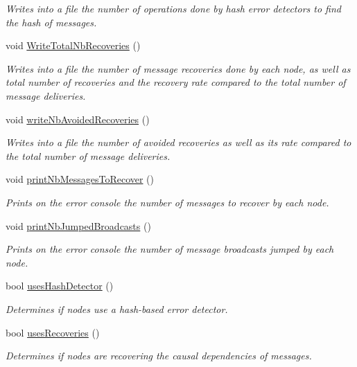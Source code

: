 \begin{DoxyCompactItemize}
\begin{DoxyCompactList}\small\item\em Writes into a file the number of operations done by hash error detectors to find the hash of messages. \end{DoxyCompactList}\item 
void \hyperlink{class_stats_a75689d1481b0605ce74d775e36c21740}{Write\+Total\+Nb\+Recoveries} ()
\begin{DoxyCompactList}\small\item\em Writes into a file the number of message recoveries done by each node, as well as total number of recoveries and the recovery rate compared to the total number of message deliveries. \end{DoxyCompactList}\item 
void \hyperlink{class_stats_ac6a0fdf44cc2a3dc11ff22eb75faacf2}{write\+Nb\+Avoided\+Recoveries} ()
\begin{DoxyCompactList}\small\item\em Writes into a file the number of avoided recoveries as well as its rate compared to the total number of message deliveries. \end{DoxyCompactList}\item 
void \hyperlink{class_stats_ae2c59851f26885a62c2e65fda16d47ee}{print\+Nb\+Messages\+To\+Recover} ()
\begin{DoxyCompactList}\small\item\em Prints on the error console the number of messages to recover by each node. \end{DoxyCompactList}\item 
void \hyperlink{class_stats_aaba10264a569b9240a300ddc341e6a8c}{print\+Nb\+Jumped\+Broadcasts} ()
\begin{DoxyCompactList}\small\item\em Prints on the error console the number of message broadcasts jumped by each node. \end{DoxyCompactList}\item 
bool \hyperlink{class_stats_a509d8e8fba4312eeffe2c6cee722f30f}{uses\+Hash\+Detector} ()
\begin{DoxyCompactList}\small\item\em Determines if nodes use a hash-\/based error detector. \end{DoxyCompactList}\item 
bool \hyperlink{class_stats_a876b1b2674fb82cb45b6bc4b094019ae}{uses\+Recoveries} ()
\begin{DoxyCompactList}\small\item\em Determines if nodes are recovering the causal dependencies of messages. \end{DoxyCompactList}\end{DoxyCompactItemize}
